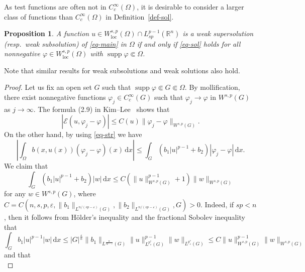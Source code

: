 \documentclass[11pt]{amsart}
\theoremstyle{plain}
\newtheorem{proposition}[theorem]{Proposition}
\theoremstyle{definition}
\numberwithin{equation}{section}
\DeclareMathOperator{\supp}{supp}
\begin{document}
As test functions are often not in $C^\infty_c(\Omega)$, it is desirable to consider a larger class of functions than $C^\infty_c(\Omega)$ in Definition~\ref{def-sol}.

\begin{proposition}\label{prop-test}
A function $u\in W^{s, p}_{\mathrm{loc}}(\Omega) \cap L^{p-1}_{sp}(\mathbb{R}^n)$  is a weak supersolution (resp.\ weak subsolution) of \eqref{eq-main} in $\Omega$ if and only if \eqref{eq-sol} holds for all nonnegative $\varphi \in W^{s, p}_{\mathrm{loc}}(\Omega)$ with $\supp{\varphi}\Subset \Omega$.
\end{proposition}

Note that similar results for weak subsolutions and weak solutions also hold.

\begin{proof}
Let us fix an open set $G$ such that $\supp{\varphi} \Subset G \Subset \Omega$. By mollification, there exist nonnegative functions $\varphi_j \in C^\infty_c(G)$ such that $\varphi_j \to \varphi$ in $W^{s, p}(G)$ as $j \to \infty$. The formula (2.9) in Kim--Lee~\cite{KL23} shows that
\begin{equation}\label{eq-test-E}
    |\mathcal{E}(u, \varphi_j-\varphi)| \leq C(u) \|\varphi_j-\varphi\|_{W^{s, p}(G)}.
\end{equation}
On the other hand, by using \eqref{eq-str} we have
\begin{equation*}
    \left| \int_\Omega b(x, u(x)) (\varphi_j-\varphi)(x) \,\mathrm{d}x \right|
    \leq \int_{G} (b_1|u|^{p-1} + b_2)|\varphi_j-\varphi| \,\mathrm{d}x.
\end{equation*}
We claim that
\begin{equation}\label{eq-b-Holder}
    \int_{G} (b_1|u|^{p-1} + b_2)|w| \,\mathrm{d}x \leq C \left( \|u\|_{W^{s, p}(G)}^{p-1} + 1 \right) \|w\|_{W^{s, p}(G)}
\end{equation}
for any $w \in W^{s, p}(G)$, where $C=C(n, s, p, \varepsilon, \|b_1\|_{L^{n/(sp-\varepsilon)}(G)}, \|b_2\|_{L^{n/(sp-\varepsilon)}(G)}, G)>0$. Indeed, if $sp<n$, then it follows from H\"older's inequality and the fractional Sobolev inequality that
\begin{equation*}
    \int_{G} b_1|u|^{p-1}|w| \,\mathrm{d}x \leq |G|^{\frac{\varepsilon}{n}} \|b_1\|_{L^{\frac{n}{sp-\varepsilon}}(G)} \|u\|_{L^{p^{\ast}_{s}}(G)}^{p-1} \|w\|_{L^{p^{\ast}_s}(G)} \leq C \|u\|_{W^{s, p}(G)}^{p-1} \|w\|_{W^{s, p}(G)}
\end{equation*}
and that
\begin{equation*}

\end{equation*}
\end{proof}
\end{document}
